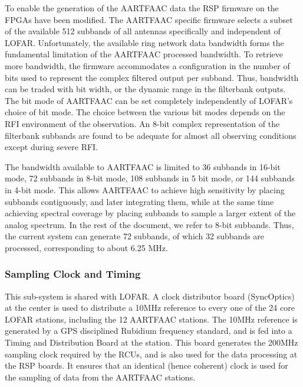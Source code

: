 \documentclass{ws-jai}
\begin{document}
To enable the generation of the AARTFAAC data the RSP firmware on the FPGAs have
been modified. The AARTFAAC specific firmware  selects a subset of the available
512  subbands   of  all   antennas  specifically   and  independent   of  LOFAR.
Unfortunately, the available  ring network data bandwidth  forms the fundamental
limitation of the AARTFAAC processed bandwidth.  To retrieve more bandwidth, the
firmware accommodates  a configuration in the  number of bits used  to represent
the complex filtered output per subband.  Thus, bandwidth can be traded with bit
width, or the dynamic range in the filterbank outputs.  The bit mode of AARTFAAC
can be  set completely independently of  LOFAR's choice of bit  mode. The choice
between the various bit modes depends on the RFI environment of the observation.
An  8-bit complex  representation of  the filterbank  subbands are  found to  be
adequate for almost all observing conditions except during severe RFI.

The bandwidth available to AARTFAAC is limited to 36 subbands in 16-bit mode, 72
subbands in  8-bit mode, 108 subbands  in 5 bit  mode, or 144 subbands  in 4-bit
mode.   This allows  AARTFAAC to  achieve high  sensitivity by  placing subbands
contiguously,  and later  integrating them,  while  at the  same time  achieving
spectral coverage  by placing subbands to  sample a larger extent  of the analog
spectrum. In the  rest of the document,  we refer to 8-bit  subbands.  Thus, the
current system  can generate 72  subbands, of  which 32 subbands  are processed,
corresponding to about 6.25 MHz.\\

\subsubsection  {Sampling Clock and  Timing}
 This sub-system is  shared with
LOFAR.  A  clock  distributor  board  (SyncOptics) at  the  center  is  used  to
distribute  a 10MHz  reference  to every  one  of the  24  core LOFAR  stations,
including the 12  AARTFAAC stations.  The 10MHz reference is  generated by a GPS
disciplined  Rubidium  frequency  standard,  and   is  fed  into  a  Timing  and
Distribution Board  at the  station.  This board  generates the  200MHz sampling
clock required by the RCUs, and is also  used for the data processing at the RSP
boards. It  ensures that  an identical  (hence coherent) clock  is used  for the
sampling of data from the AARTFAAC stations.
\end{document}
